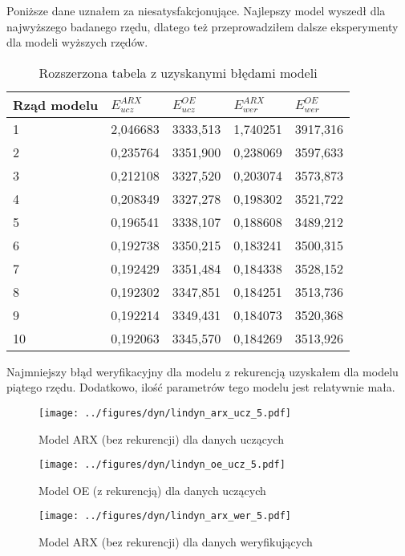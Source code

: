 \documentclass[a4paper,titlepage,11pt,floatssmall]{mwrep}
\begin{document}
Poniższe dane uznałem za niesatysfakcjonujące. Najlepszy model wyszedł dla najwyższego badanego rzędu, dlatego też przeprowadziłem dalsze eksperymenty dla modeli wyższych rzędów.

\begin{table}[H]
\centering
\caption{Rozszerzona tabela z uzyskanymi błędami modeli}
\begin{tabular}{|l|l|l|l|l|}
\hline
Rząd modelu & $E_{ucz}^{ARX}$     & $E_{ucz}^{OE} $    &$ E_{wer}^{ARX} $    & $E_{wer}^{OE}$     \\ \hline
1           & 2,046683 & 3333,513 & 1,740251 & 3917,316 \\ \hline
2           & 0,235764 & 3351,900 & 0,238069 & 3597,633 \\ \hline
3           & 0,212108 & 3327,520 & 0,203074 & 3573,873 \\ \hline
4           & 0,208349 & 3327,278 & 0,198302 & 3521,722 \\ \hline
5           & 0,196541 & 3338,107 & 0,188608 & 3489,212 \\ \hline
6           & 0,192738 & 3350,215 & 0,183241 & 3500,315 \\ \hline
7           & 0,192429 & 3351,484 & 0,184338 & 3528,152 \\ \hline
8           & 0,192302 & 3347,851 & 0,184251 & 3513,736 \\ \hline
9           & 0,192214 & 3349,431 & 0,184073 & 3520,368 \\ \hline
10          & 0,192063 & 3345,570 & 0,184269 & 3513,926 \\ \hline
\end{tabular}
\end{table}

Najmniejszy błąd weryfikacyjny dla modelu z rekurencją uzyskałem dla modelu piątego rzędu. Dodatkowo, ilość parametrów tego modelu jest relatywnie mała. 

\begin{figure}[H]
\centering
\texttt{[image: ../figures/dyn/lindyn\_arx\_ucz\_5.pdf]}
\caption{Model ARX (bez rekurencji) dla danych uczących}
\end{figure}

\begin{figure}[H]
\centering
\texttt{[image: ../figures/dyn/lindyn\_oe\_ucz\_5.pdf]}
\caption{Model OE (z rekurencją) dla danych uczących}
\end{figure}

\begin{figure}[H]
\centering
\texttt{[image: ../figures/dyn/lindyn\_arx\_wer\_5.pdf]}
\caption{Model ARX (bez rekurencji) dla danych weryfikujących}
\end{figure}
\end{document}
